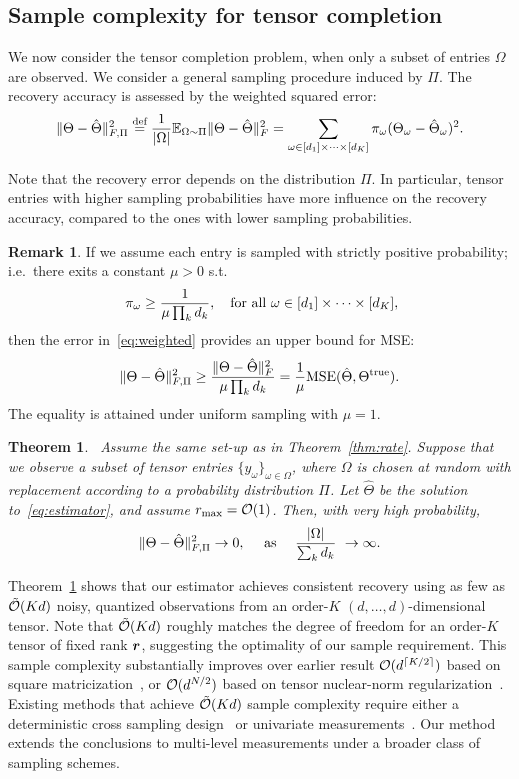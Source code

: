 \documentclass{article}
\theoremstyle{plain}
\newtheorem{thm}{Theorem}[section]
\theoremstyle{definition}
\newtheorem{rmk}{Remark}
\begin{document}
\subsection{Sample complexity for tensor completion}
\vspace{-.2cm}
We now consider the tensor completion problem, when only a subset of entries $\Omega$ are observed. We consider a general sampling procedure induced by $\Pi$. The recovery accuracy is assessed by the weighted squared error:
\begin{align}\label{eq:weighted}
\lVert\Theta-\hat \Theta\rVert_{F,\Pi}^2\stackrel{\text{def}}{=}
{1\over |\Omega|}\mathbb{E}_{\Omega\sim \Pi}\lVert\Theta-\hat \Theta\rVert_F^2
=\sum_{\omega\in[d_1]\times \cdots \times [d_K]} \pi_{\omega}(\Theta_{\omega}-\hat \Theta_{\omega})^2.
\end{align}

Note that the recovery error depends on the distribution $\Pi$. In particular, tensor entries with higher sampling probabilities have more influence on the recovery accuracy, compared to the ones with lower sampling probabilities.

\begin{rmk} If we assume each entry is sampled with strictly positive probability; i.e.\ there exits a constant $\mu> 0$ s.t.
\[
\ \pi_\omega\geq {1\over \mu \prod_k d_k},\quad \text{for all}\ \omega\in[d_1]\times\cdots \times [d_K],
\]
then the error in~\eqref{eq:weighted} provides an upper bound for MSE:
\[
\lVert\Theta-\hat \Theta\rVert_{F,\Pi}^2 \geq {\lVert\Theta-\hat \Theta\rVert_F^2\over \mu \prod_kd_k}={1\over \mu}\text{MSE}(\hat \Theta, \Theta^{\text{true}}).
\]
The equality is attained under uniform sampling with $\mu=1$.
\end{rmk}


\begin{thm}~\label{thm:completion}
Assume the same set-up as in Theorem~\ref{thm:rate}. Suppose that we observe a subset of tensor entries $\{y_\omega\}_{\omega\in\Omega}$, where $\Omega$ is chosen at random with replacement according to a probability distribution $\Pi$. Let $\hat \Theta$ be the solution to~\eqref{eq:estimator}, and assume $r_{\max}=\mathcal{O}(1)$. Then, with very high probability,
\[
\lVert\Theta-\hat \Theta\rVert_{F,\Pi}^2 \to 0,\quad \text{ as }\quad {|\Omega|\over \sum_k d_k} \ \to \infty.
\]
\end{thm}
Theorem~\ref{thm:completion} shows that our estimator achieves consistent recovery using as few as $\tilde{\mathcal{O}}(Kd)$ noisy, quantized observations from an order-$K$ $(d,\ldots,d)$-dimensional tensor. Note that $\tilde {\mathcal{O}}(Kd)$ roughly matches the degree of freedom for an order-$K$ tensor of fixed rank $\bm{r}$, suggesting the optimality of our sample requirement. This sample complexity substantially improves over earlier result $\mathcal{O}(d^{\lceil K/2\rceil})$ based on square matricization~\cite{mu2014square}, or $\mathcal{O}(d^{N/2})$ based on tensor nuclear-norm regularization~\cite{yuan2016tensor}. Existing methods that achieve $\tilde {\mathcal{O}}(Kd)$ sample complexity require either a deterministic cross sampling design~\cite{zhang2019cross} or univariate measurements~\cite{ghadermarzy2018learning}. Our method extends the conclusions to multi-level measurements under a broader class of sampling schemes.
\end{document}
